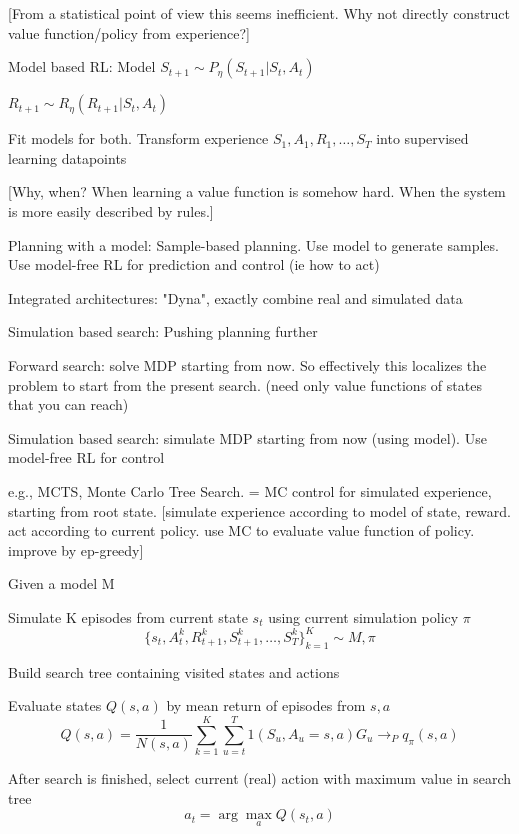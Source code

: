 \documentclass[english]{article}
\begin{document}
[From a statistical point of view this seems inefficient. Why not directly construct value function/policy from experience?]


\item Model based RL: Model $S_{t+1}\sim P_\eta(S_{t+1}|S_t, A_t)$

$R_{t+1}\sim R_\eta(R_{t+1}|S_t, A_t)$

Fit models for both. Transform experience $S_1,A_1, R_1, \ldots, S_T$ into supervised learning datapoints

[Why, when? When learning a value function is somehow hard. When the system is more easily described by rules.]


\item Planning with a model: Sample-based planning. Use model to generate samples. Use model-free RL for prediction and control (ie how to act)

\item Integrated architectures: "Dyna", exactly combine real and simulated data

\item Simulation based search: Pushing planning further

Forward search: solve MDP starting from now. So effectively this localizes the problem to start from the present search. (need only value functions of states that you can reach)

Simulation based search: simulate MDP starting from now (using model). Use model-free RL for control

e.g., MCTS, Monte Carlo Tree Search. = MC control for simulated experience, starting from root state. [simulate experience according to model of state, reward. act according to current policy. use MC to evaluate value function of policy. improve by ep-greedy]

\benum
\item Given a model M
\item  Simulate K episodes from current state $s_t$ using current
simulation policy $\pi$
$$\{s_t ,A^k_t ,R^k_{t+1},S^k_{t+1},\ldots,S^k_{T}\}^K_{k=1}
\sim M,\pi$$
\item Build  search tree containing visited states and actions
\item Evaluate states $Q(s,a)$ by mean return of episodes from $s,a$
$$Q(s,a) =
\frac{1}
{N(s,a)}
\sum^K_{k=1}
\sum_{u=t}^T
1(S_u ,A_u = s,a)G_u
\to_P q_{\pi}(s,a)
$$

\item After search is finished, select current (real) action with
maximum value in search tree
$$a_t = \arg\max_a
Q(s_t ,a)$$
\eenum
\end{document}
